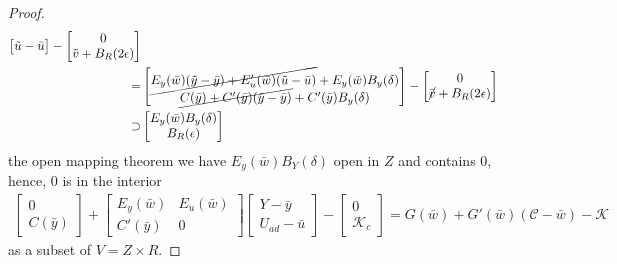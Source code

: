 \documentclass[a4paper,11pt,fleqn]{book}
\theoremstyle{definition}
\theoremstyle{remark}
\begin{document}
\begin{proof}
\begin{align*}
\begin{bmatrix}
	 		\tilde{u} - \bar{u}
	 	\end{bmatrix}
	 	- 
	 	\begin{bmatrix}
	 		0\\
	 		\tilde{v} + B_R(2 \epsilon)
	 	\end{bmatrix}\\
	 	=& 
	 	\begin{bmatrix}
	 		\cancel{E_y(\bar{w})(\tilde{y} - \bar{y}) + E_u'(\bar{w})( \tilde{u} - \bar{u})} + E_y(\bar{w}) B_y(\delta)\\
	 		\cancel{C(\bar{y}) + C'(\bar{y})(\tilde{y} - \bar{y}) }+ C'(\bar{y})B_y(\delta) 
	 	\end{bmatrix}
	 	-
	 	\begin{bmatrix}
	 		0\\
	 		\cancel{\bar{v}} + B_R(2\epsilon) 
	 	\end{bmatrix}
	 	\\
	 	\supset&
	 	\begin{bmatrix}
	 		E_y(\bar{w}) B_y(\delta)\\
	 		B_R(\epsilon)
	 	\end{bmatrix}
	 \end{align*}
	 the open mapping theorem we have $E_y(\bar{w}) B_Y(\delta)$ open in $Z$ and contains $0$, hence, $0$ is in the interior 
	 \begin{align*}
\begin{bmatrix}
	 		0\\
	 		C(\bar{y})
	 	\end{bmatrix}
	 	+ 
	 	\begin{bmatrix}
	 		E_y(\bar{w}) & E_u(\bar{w})\\
	 		C'(\bar{y}) & 0
	 	\end{bmatrix}
	 	\begin{bmatrix}
	 		Y - \bar{y}\\
	 		U_{ad} - \bar{u}
	 	\end{bmatrix}
	 	-
	 	\begin{bmatrix}
	 		0\\
	 		\mathcal{K}_c
	 	\end{bmatrix}
	 	= G(\bar{w}) + G'(\bar{w})(\mathcal{C} - \bar{w}) - \mathcal{K}
	 \end{align*}
	 as a subset of $V = Z \times R$. 
\end{proof}
\end{document}
